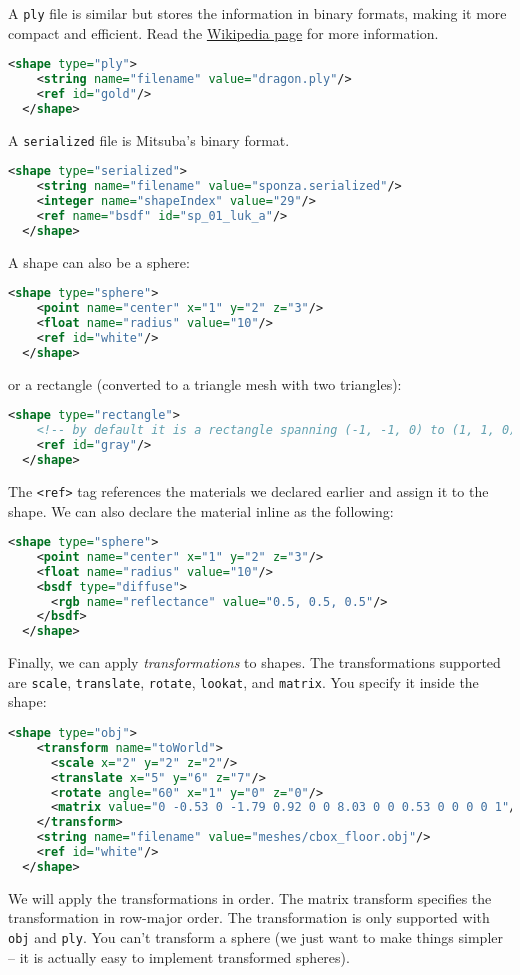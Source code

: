 A \lstinline{ply} file is similar but stores the information in binary formats, making it more compact and efficient. Read the \href{https://en.wikipedia.org/wiki/PLY_(file_format)}{Wikipedia page} for more information.
\begin{lstlisting}[language=xml]
  <shape type="ply">
    <string name="filename" value="dragon.ply"/>
    <ref id="gold"/>
  </shape>
\end{lstlisting}

A \lstinline{serialized} file is Mitsuba's binary format.
\begin{lstlisting}[language=xml]
  <shape type="serialized">
    <string name="filename" value="sponza.serialized"/>
    <integer name="shapeIndex" value="29"/>
    <ref name="bsdf" id="sp_01_luk_a"/>
  </shape>
\end{lstlisting}

A shape can also be a sphere:
\begin{lstlisting}[language=xml]
  <shape type="sphere">
    <point name="center" x="1" y="2" z="3"/>
    <float name="radius" value="10"/>
    <ref id="white"/>
  </shape>
\end{lstlisting}
or a rectangle (converted to a triangle mesh with two triangles):
\begin{lstlisting}[language=xml]
  <shape type="rectangle">
    <!-- by default it is a rectangle spanning (-1, -1, 0) to (1, 1, 0) -->
    <ref id="gray"/>
  </shape>
\end{lstlisting}

The \lstinline{<ref>} tag references the materials we declared earlier and assign it to the shape. We can also declare the material inline as the following:
\begin{lstlisting}[language=xml]
  <shape type="sphere">
    <point name="center" x="1" y="2" z="3"/>
    <float name="radius" value="10"/>
    <bsdf type="diffuse">
      <rgb name="reflectance" value="0.5, 0.5, 0.5"/>
    </bsdf>
  </shape>
\end{lstlisting}

Finally, we can apply \emph{transformations} to shapes. The transformations supported are \lstinline{scale}, \lstinline{translate}, \lstinline{rotate}, \lstinline{lookat}, and \lstinline{matrix}. You specify it inside the shape:
\begin{lstlisting}[language=xml]
  <shape type="obj">
    <transform name="toWorld">
      <scale x="2" y="2" z="2"/>
      <translate x="5" y="6" z="7"/>
      <rotate angle="60" x="1" y="0" z="0"/>
      <matrix value="0 -0.53 0 -1.79 0.92 0 0 8.03 0 0 0.53 0 0 0 0 1"/>
    </transform>
    <string name="filename" value="meshes/cbox_floor.obj"/>
    <ref id="white"/>
  </shape>
\end{lstlisting}
We will apply the transformations in order. The matrix transform specifies the transformation in row-major order.
The transformation is only supported with \lstinline{obj} and \lstinline{ply}. You can't transform a sphere (we just want to make things simpler -- it is actually easy to implement transformed spheres).

